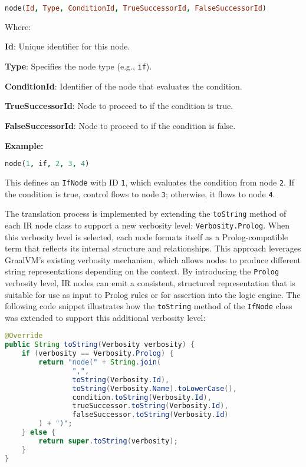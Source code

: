 \begin{lstlisting}[language=Prolog]
node(Id, Type, ConditionId, TrueSuccessorId, FalseSuccessorId)
\end{lstlisting}

Where:
\begin{description}
  \item \textbf{Id}: Unique identifier for this node.
  \item \textbf{Type}: Specifies the node type (e.g., \texttt{if}).
  \item \textbf{ConditionId}: Identifier of the node that evaluates the condition.
  \item \textbf{TrueSuccessorId}: Node to proceed to if the condition is true.
  \item \textbf{FalseSuccessorId}: Node to proceed to if the condition is false.
\end{description}

\textbf{Example:}
\begin{lstlisting}[language=Prolog]
node(1, if, 2, 3, 4)
\end{lstlisting}
This defines an \texttt{IfNode} with ID \texttt{1}, which evaluates the condition from node \texttt{2}. If the condition is true, control flows to node \texttt{3}; otherwise, it flows to node \texttt{4}.

\bigskip

The translation process is implemented by extending the \texttt{toString} method of each IR node class to support a new verbosity level: \texttt{Verbosity.Prolog}. When this verbosity level is selected, each node formats itself as a Prolog-compatible term that reflects its internal structure and relationships. This approach leverages GraalVM's existing verbosity mechanism, which allows nodes to produce different string representations depending on the context.
By introducing the \texttt{Prolog} verbosity level, IR nodes can emit a consistent, structured representation that is suitable for use as input to Prolog rules or for assertion into the logic engine. The following code snippet illustrates how the \texttt{toString} method of the \texttt{IfNode} class was extended to support this additional verbosity level:

\begin{lstlisting}[language=Java]
@Override
public String toString(Verbosity verbosity) {
    if (verbosity == Verbosity.Prolog) {
        return "node(" + String.join(
                ",",
                toString(Verbosity.Id),
                toString(Verbosity.Name).toLowerCase(),
                condition.toString(Verbosity.Id),
                trueSuccessor.toString(Verbosity.Id),
                falseSuccessor.toString(Verbosity.Id)
        ) + ")";
    } else {
        return super.toString(verbosity);
    }
}
\end{lstlisting}
